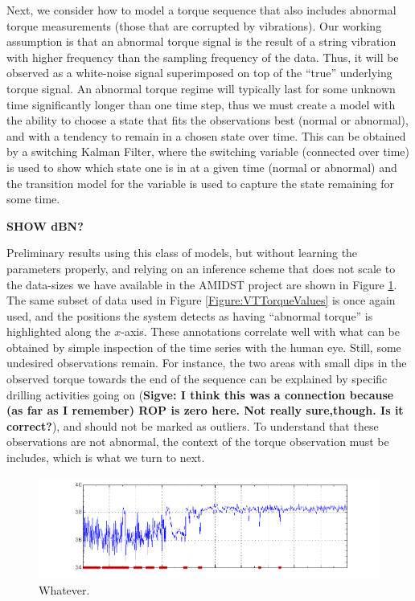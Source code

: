 Next, we consider how to model a torque sequence that also includes  abnormal torque measurements (those that are corrupted by vibrations). 
Our working assumption is that an abnormal torque signal is the result of a string vibration with higher frequency than the sampling frequency of the data. Thus, it will be observed as a white-noise signal superimposed on top of the ``true'' underlying torque signal. An abnormal torque regime will typically last for some unknown time significantly longer than one time step, thus we must create a model with the ability to choose a state that fits the observations best (normal or abnormal), and with a tendency to remain in a chosen state over time. This can be obtained by a switching Kalman Filter, where the switching variable (connected over time) is used to show which state one is in at a given time (normal or abnormal) and the transition model for the variable is used to capture the state remaining for some time. 

{\bf SHOW dBN?}

Preliminary results using this class of models, but without learning the parameters properly, and relying on an inference scheme that does not scale to the data-sizes we have available in the AMIDST project are shown in Figure \ref{Figure:VTEraticTorqueMarked}. The same subset of data used in Figure \ref{Figure:VTTorqueValues} is once again used, and the positions the system detects as having ``abnormal torque'' is highlighted along the $x$-axis. These annotations correlate well with what can be obtained by simple inspection of the time series with the human eye. Still, some undesired observations remain. For instance, the two  areas with small dips in the observed torque towards the end of the sequence can be explained by specific drilling activities going on ({\bf Sigve: I think this was a connection because (as far as I remember) ROP is zero here. Not really sure,though. Is it correct?}), and should not be marked as outliers. To understand that these observations are not abnormal, the context of the torque observation must be includes, which is what we turn to next.

\begin{figure}
\begin{center}
\includegraphics[scale=0.3]{./figures/VT_ErraticTRQ_marked} 
\caption{\label{Figure:VTEraticTorqueMarked}  Whatever.}
\end{center}
\end{figure}



